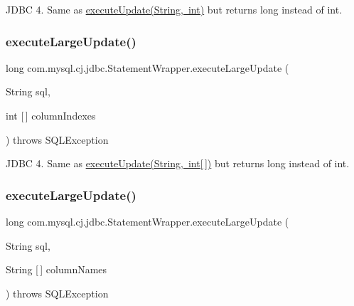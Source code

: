 J\+D\+BC 4. Same as \mbox{\hyperlink{classcom_1_1mysql_1_1cj_1_1jdbc_1_1_statement_wrapper_aa1d6ae38bd7f57560c93b45fed82f713}{execute\+Update(\+String, int)}} but returns long instead of int. \mbox{\label{classcom_1_1mysql_1_1cj_1_1jdbc_1_1_statement_wrapper_a30669664b8085abf39605e17a93a2267}} 
\subsubsection{\texorpdfstring{execute\+Large\+Update()}{executeLargeUpdate()}\hspace{0.1cm}{\footnotesize\ttfamily [3/4]}}
{\footnotesize\ttfamily long com.\+mysql.\+cj.\+jdbc.\+Statement\+Wrapper.\+execute\+Large\+Update (\begin{DoxyParamCaption}\item[{String}]{sql,  }\item[{int \mbox{[}$\,$\mbox{]}}]{column\+Indexes }\end{DoxyParamCaption}) throws S\+Q\+L\+Exception}

J\+D\+BC 4. Same as \mbox{\hyperlink{}{execute\+Update(\+String, int\mbox{[}$\,$\mbox{]})}} but returns long instead of int. \mbox{\label{classcom_1_1mysql_1_1cj_1_1jdbc_1_1_statement_wrapper_a907a6487714ad7ebfa9748941e8536ba}} 
\subsubsection{\texorpdfstring{execute\+Large\+Update()}{executeLargeUpdate()}\hspace{0.1cm}{\footnotesize\ttfamily [4/4]}}
{\footnotesize\ttfamily long com.\+mysql.\+cj.\+jdbc.\+Statement\+Wrapper.\+execute\+Large\+Update (\begin{DoxyParamCaption}\item[{String}]{sql,  }\item[{String \mbox{[}$\,$\mbox{]}}]{column\+Names }\end{DoxyParamCaption}) throws S\+Q\+L\+Exception}

